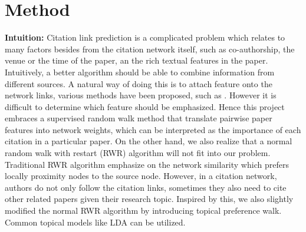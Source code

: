 \documentclass{article} %
\begin{document}
\section{Method}
\textbf{Intuition:} Citation link prediction is a complicated problem which relates to many factors besides from the citation network itself, such as co-authorship, the venue or the time of the paper, an the rich textual features in the paper. Intuitively, a better algorithm should be able to combine information from different sources. A natural way of doing this is to attach feature onto the network links, various methods have been proposed, such as \cite{Liben-Nowell2007}. However it is difficult to determine which feature should be emphasized. Hence this project embraces a supervised random walk method that translate pairwise paper features into network weights, which can be interpreted as the importance of each citation in a particular paper.  On the other hand, we also realize that a normal random walk with restart (RWR) algorithm will not fit into our problem. Traditional RWR algorithm emphasize on the network similarity which prefers locally proximity nodes to the source node. However, in a citation network, authors do not only follow the citation links, sometimes they also need to cite other related papers given their research topic. Inspired by this, we also slightly modified the normal RWR algorithm by introducing topical preference walk. Common topical models like LDA \cite{blei2003latent} can be utilized.
\end{document}
